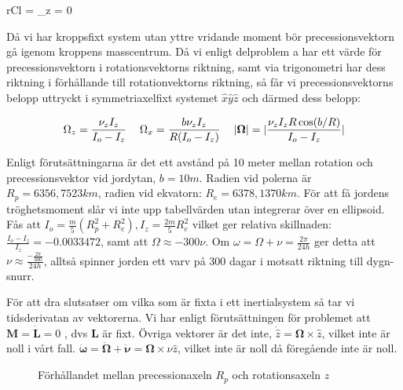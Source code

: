 \documentclass[12pt,a4paper]{article}
\begin{document}
	\begin{IEEEeqnarray*}{rCl}
		 = 
		\hspace{24pt}
		\hspace{24pt}
		\dot{\nu}_z = 0
	\end{IEEEeqnarray*}
	
	Då vi har kroppsfixt system utan yttre vridande moment bör precessionsvektorn
	gå igenom kroppens masscentrum.  Då vi enligt delproblem a har ett värde för
	precessionsvektorn i rotationsvektorns riktning, samt via trigonometri har dess
	riktning i förhållande till rotationvektorns riktning, så får vi precessionsvektorns
	belopp uttryckt i symmetriaxelfixt systemet $\hat{x}\hat{y}\hat{z}$ och därmed dess belopp:
	
	\begin{equation*}
		\Omega_z = \frac{\nu_z I_z}{I_o-I_z}
		\hspace{12pt}
		\Omega_x = \frac{b \nu_z I_z}{R(I_o-I_z)}
		\hspace{12pt}
		|\boldsymbol{\Omega}| = \arrowvert\frac{\nu_z I_z R \cos(b/R)}{I_o-I_z}\arrowvert
	\end{equation*}
	
	Enligt förutsättningarna är det ett avstånd på 10 meter mellan rotation och
	precessionsvektor vid jordytan, $b=10m$. Radien vid polerna är $R_p= 6356,7523 km$,
	radien vid ekvatorn: $R_e=6378,1370 km$. För att få jordens tröghetsmoment slår vi
	inte upp tabellvärden utan integrerar över en ellipsoid.
	Fås att $I_o = \frac{m}{5}(R_p^2+R_e^2), I_z = \frac{2m}{5}R_e^2$ vilket ger relativa
	skillnaden: $\frac{I_o-I_z}{I_z} = -0.0033472$, samt att $\Omega \approx -300\nu$. Om
	$\omega=\Omega+\nu = \frac{2\pi}{24h}$ ger detta att
	$\nu \approx \frac{-\frac{2\pi}{300}}{24h}$, alltså spinner jorden ett varv på 300
	dagar i motsatt riktning till dygn-snurr.
	
	För att dra slutsatser om vilka som är fixta i ett inertialsystem så tar vi tidsderivatan av
	vektorerna. Vi har enligt förutsättningen för problemet att $\mathbf{M} = \dot{\mathbf{L}}=0$ ,
	dvs $\mathbf{L}$ är fixt. Övriga vektorer är det inte, $\dot{\hat{z}}=\boldsymbol{\Omega} \times \hat{z}$,
	vilket inte är noll i vårt fall. $\dot{\boldsymbol{\omega}} = \dot{\boldsymbol{\Omega}}+\dot{\boldsymbol{\nu}} =
	\boldsymbol{\Omega} \times \nu \hat{z}$, vilket inte är noll då föregående inte är noll.
	
	\begin{figure}
		\begin{center}
			
			\caption{Förhållandet mellan precessionaxeln $R_p$ och rotationsaxeln $z$}
		\end{center}
	\end{figure}
	
\end{document}

